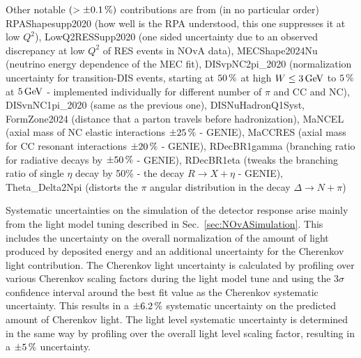 Other notable $\left(>\pm\unit[0.1]{\%}\right)$ contributions are from (in no particular order)
RPAShapesupp2020 (how well is the \gls{RPA} understood, this one suppresses it at low $Q^2$),
LowQ2RESSupp2020 (one sided uncertainty due to an observed discrepancy at low $Q^2$ of RES events in NOvA data),
MECShape2024Nu (neutrino energy dependence of the MEC fit),
DISvpNC2pi\_2020 (normalization uncertainty for transition-DIS events, starting at $\unit[50]{\%}$ at high $W\leq\unit[3]{GeV}$ to $\unit[5]{\%}$ at $\unit[5]{GeV}$ - implemented individually for different number of $\pi$ and CC and NC),
DISvnNC1pi\_2020 (same as the previous one),
DISNuHadronQ1Syst, FormZone2024 (distance that a parton travels before hadronization),
MaNCEL (axial mass of NC elastic interactions $\pm\unit[25]{\%}$ - GENIE),
MaCCRES (axial mass for CC resonant interactions $\pm\unit[20]{\%}$ - GENIE),
RDecBR1gamma (branching ratio for radiative decays by $\pm\unit[50]{\%}$ - GENIE),
RDecBR1eta (tweaks the branching ratio of single $\eta$ decay by 50\% - the decay $R\rightarrow X+\eta$ - GENIE),
Theta_Delta2Npi (distorts the $\pi$ angular distribution in the decay $\Delta\rightarrow N+\pi$)
\fi


Systematic uncertainties on the simulation of the detector response arise mainly from the light model tuning described in Sec.~\ref{sec:NOvASimulation}. This includes the uncertainty on the overall normalization of the amount of light produced by deposited energy and an additional uncertainty for the Cherenkov light contribution. The Cherenkov light uncertainty is calculated by profiling over various Cherenkov scaling factors during the light model tune and using the $3\sigma$ confidence interval around the best fit value as the Cherenkov systematic uncertainty. This results in a $\pm\unit[6.2]{\%}$ systematic uncertainty on the predicted amount of Cherenkov light. The light level systematic uncertainty is determined in the same way by profiling over the overall light level scaling factor, resulting in a $\pm\unit[5]{\%}$ uncertainty.


